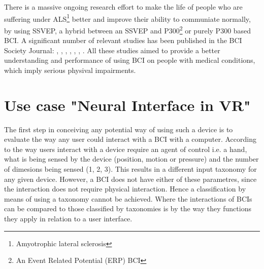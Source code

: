             There is a massive ongoing research effort to make the life of people who are suffering under ALS\footnote{Amyotrophic lateral sclerosis} better and improve their ability to communiate normally, by using SSVEP, a hybrid between an SSVEP and P300\footnote{An Event Related Potential (ERP) BCI} or purely P300 based BCI. A significant number of relevant studies has been published in the BCI Society Journal: \cite{Sugata.2016}, \cite{Holz.2015}, \cite{Speier.2017}, \cite{Geronimo.2017}, \cite{Speier.2018}, \cite{Mowla.2017}, \cite{Huggins.2016}. All these studies aimed to provide a better understanding and performance of using BCI on people with medical conditions, which imply serious physival impairments.


        \section{Use case "Neural Interface in VR"}\label{use-case}

            The first step in conceiving any potential way of using such a device is to evaluate the way any user could interact with a BCI with a computer. According to \cite[4.13]{Buxton.2010} the way users interact with a device require an agent of control i.e. a hand, what is being sensed by the device (position, motion or pressure) and the number of dimesions being sensed (1, 2, 3). This results in a different input taxonomy for any given device. However, a BCI does not have either of these parametres, since the interaction does not require physical interaction. Hence a classification by means of using a taxonomy cannot be achieved. Where the interactions of BCIs can be compared to those classified by taxonomies is by the way they functions they apply in relation to a user interface.

